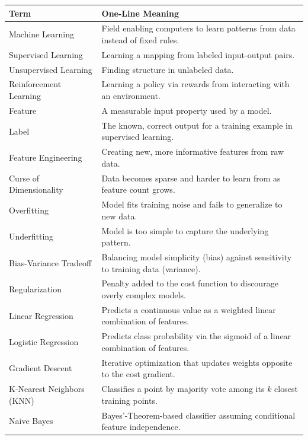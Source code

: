 \documentclass[11pt,a4paper]{article}
\begin{document}
\begin{longtable}{@{}p{3.3cm}p{10.2cm}@{}}
\toprule
\rowcolor{primary!15}
\textbf{Term} & \textbf{One-Line Meaning} \\
\midrule
\endhead
Machine Learning & Field enabling computers to learn patterns from data instead of fixed rules. \\
\addlinespace
Supervised Learning & Learning a mapping from labeled input-output pairs. \\
\addlinespace
Unsupervised Learning & Finding structure in unlabeled data. \\
\addlinespace
Reinforcement Learning & Learning a policy via rewards from interacting with an environment. \\
\addlinespace
Feature & A measurable input property used by a model. \\
\addlinespace
Label & The known, correct output for a training example in supervised learning. \\
\addlinespace
Feature Engineering & Creating new, more informative features from raw data. \\
\addlinespace
Curse of Dimensionality & Data becomes sparse and harder to learn from as feature count grows. \\
\addlinespace
Overfitting & Model fits training noise and fails to generalize to new data. \\
\addlinespace
Underfitting & Model is too simple to capture the underlying pattern. \\
\addlinespace
Bias-Variance Tradeoff & Balancing model simplicity (bias) against sensitivity to training data (variance). \\
\addlinespace
Regularization & Penalty added to the cost function to discourage overly complex models. \\
\addlinespace
Linear Regression & Predicts a continuous value as a weighted linear combination of features. \\
\addlinespace
Logistic Regression & Predicts class probability via the sigmoid of a linear combination of features. \\
\addlinespace
Gradient Descent & Iterative optimization that updates weights opposite to the cost gradient. \\
\addlinespace
K-Nearest Neighbors (KNN) & Classifies a point by majority vote among its $k$ closest training points. \\
\addlinespace
Naive Bayes & Bayes'-Theorem-based classifier assuming conditional feature independence. \\

\end{longtable}
\end{document}
